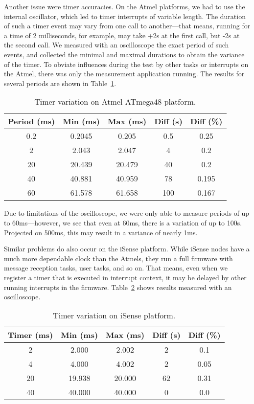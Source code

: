 Another issue were timer accuracies. On the Atmel platforms, we had to
use the internal oscillator, which led to timer interrupts of variable
length. The duration of such a timer event may vary from one call to
another---that means, running for a time of 2 milliseconds, for
example, may take +2s at the first call, but -2s at the
second call. We measured with an oscilloscope the exact period of such
events, and collected the minimal and maximal durations to obtain the
variance of the timer. To obviate influences during the test by other
tasks or interrupts on the Atmel, there was only the measurement
application running. The results for several periods are shown in
Table~\ref{sec:exp:atmel_clock}.

\begin{table}
  \caption{Timer variation on Atmel ATmega48 platform.}
  \center
  \begin{tabular}{ |c|c c c c| }
    \hline
    Period (ms) & Min (ms) & Max (ms) & Diff (s) & Diff (\%) \\
    \hline
    0.2 &  0.2045 &  0.205 & 0.5 & 0.25 \\
    2   &  2.043  &  2.047 & 4   & 0.2 \\
    20  & 20.439  & 20.479 & 40  & 0.2 \\
    40  & 40.881  & 40.959 & 78  & 0.195 \\
    60  & 61.578  & 61.658 & 100 & 0.167 \\
    \hline
  \end{tabular}
  \label{sec:exp:atmel_clock}
\end{table}

Due to limitations of the oscilloscope, we were only able to measure
periods of up to 60ms---however, we see that even at 60ms, there is a
variation of up to 100s. Projected on 500ms, this may result in a
variance of nearly 1ms.

Similar problems do also occur on the iSense platform. While iSense
nodes have a much more dependable clock than the Atmels, they run a
full firmware with message reception tasks, user tasks, and so
on. That means, even when we register a timer that is executed in
interrupt context, it may be delayed by other running interrupts in
the firmware. Table~\ref{sec:exp:isense_timer} shows results
measured with an oscilloscope.

\begin{table}
  \caption{Timer variation on iSense platform.}
  \center
  \begin{tabular}{ |c|c c c c| }
    \hline
    Timer (ms) & Min (ms) & Max (ms) & Diff (s) & Diff (\%) \\
    \hline
    2  &  2.000 &  2.002 &  2 & 0.1  \\
    4  &  4.000 &  4.002 &  2 & 0.05 \\
    20 & 19.938 & 20.000 & 62 & 0.31 \\
    40 & 40.000 & 40.000 &  0 & 0.0  \\
    \hline
  \end{tabular}
  \label{sec:exp:isense_timer}
\end{table}

